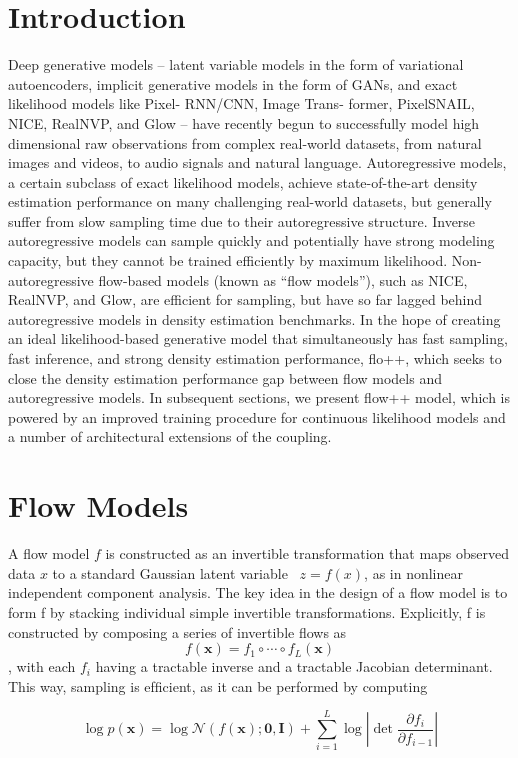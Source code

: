 \documentclass[]{IEEEtran}
\begin{document}
\section{Introduction} \label{sec:introduction}
Deep generative models – latent variable models in the form of variational autoencoders, implicit generative models in the form of GANs, and exact likelihood models like Pixel- RNN/CNN, Image Trans- former, PixelSNAIL, NICE, RealNVP, and Glow – have recently begun to successfully model high dimensional raw observations from complex real-world datasets, from natural images and videos, to audio signals and natural language.
Autoregressive models, a certain subclass of exact likelihood models, achieve state-of-the-art density estimation performance on many challenging real-world datasets, but generally suffer from slow sampling time due to their autoregressive structure. Inverse autoregressive models can sample quickly and potentially have strong modeling capacity, but they cannot be trained efficiently by maximum likelihood. Non-autoregressive flow-based models (known as “flow models”), such as NICE, RealNVP, and Glow, are efficient for sampling, but have so far lagged behind autoregressive models in density estimation benchmarks. 
In the hope of creating an ideal likelihood-based generative model that simultaneously has fast sampling, fast inference, and strong density estimation performance, flo++, which seeks to close the density estimation performance gap between flow models and autoregressive models. In subsequent sections, we present flow++ model, which is powered by an improved training procedure for continuous likelihood models and a number of architectural extensions of the coupling. 

\section{Flow Models}
A flow model $f$ is constructed as an invertible transformation that maps observed data $x$ to a standard Gaussian latent variable ~\(z = f(x)\), as in nonlinear independent component analysis. The key idea in the design of a flow model is to form f by stacking individual simple invertible transformations. Explicitly, f is constructed by composing a series of invertible ﬂows as ~$$f(\mathbf{x})=f_{1} \circ \cdots \circ f_{L}(\mathbf{x})$$, with each $f_i$ having a tractable inverse and a tractable Jacobian determinant. This way, sampling is efﬁcient, as it can be performed by computing

\begin{equation}
\log p(\mathbf{x})=\log \mathcal{N}(f(\mathbf{x}) ; \mathbf{0}, \mathbf{I})+\sum_{i=1}^{L} \log \left|\operatorname{det} \frac{\partial f_{i}}{\partial f_{i-1}}\right|
\label{fpp01}
\end{equation}
\end{document}
